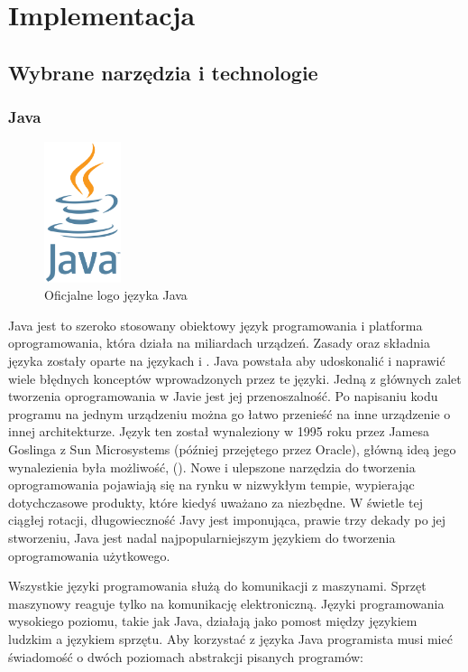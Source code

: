 \chapter{Implementacja}
\section{Wybrane narzędzia i technologie}
\subsection{Java}

\begin{figure}[!htbp]
    \centering
    \includegraphics[width=0.2\textwidth]{images/javaLogo.png}
    \caption{Oficjalne logo języka Java}
    \label{fig:enter-label}
\end{figure}

Java jest to szeroko stosowany obiektowy język programowania i platforma oprogramowania, która działa na miliardach urządzeń. Zasady oraz składnia języka zostały oparte na językach  i . Java powstała aby udoskonalić i naprawić wiele błędnych konceptów wprowadzonych przez te języki. Jedną z głównych zalet tworzenia oprogramowania w Javie jest jej przenoszalność. Po napisaniu kodu programu na jednym urządzeniu można go łatwo przenieść na inne urządzenie o innej architekturze. Język ten został wynaleziony w 1995 roku przez Jamesa Goslinga z Sun Microsystems (później przejętego przez Oracle), główną ideą jego wynalezienia była możliwość,   (). Nowe i ulepszone narzędzia do tworzenia oprogramowania pojawiają się na rynku w nizwykłym tempie, wypierając dotychczasowe produkty, które kiedyś uważano za niezbędne. W świetle tej ciągłej rotacji, długowieczność Javy jest imponująca, prawie trzy dekady po jej stworzeniu, Java jest nadal najpopularniejszym językiem do tworzenia oprogramowania użytkowego\cite{javaIBM}\cite{javaDEV}.

Wszystkie języki programowania służą do komunikacji z maszynami. Sprzęt maszynowy reaguje tylko na komunikację elektroniczną. Języki programowania wysokiego poziomu, takie jak Java, działają jako pomost między językiem ludzkim a językiem sprzętu. Aby korzystać z języka Java programista musi mieć świadomość o dwóch poziomach abstrakcji pisanych programów: 

